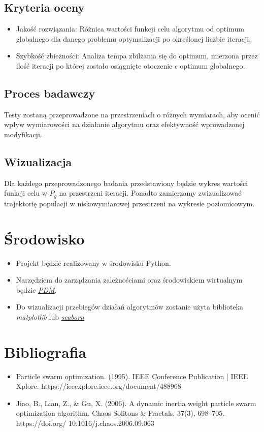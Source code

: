 \documentclass[12pt]{article}
\begin{document}
\subsection*{Kryteria oceny}
\begin{itemize}
	\item{Jakość rozwiązania: Różnica wartości funkcji celu algorytmu od optimum globalnego dla danego problemu optymalizacji po określonej liczbie iteracji.}

	\item{Szybkość zbieżności: Analiza tempa zbilżania się do optimum, mierzona przez ilość iteracji po której zostało osiągnięte otoczenie $\epsilon$ optimum globalnego.}
\end{itemize}

\subsection*{Proces badawczy}
Testy zostaną przeprowadzone na przestrzeniach o różnych wymiarach, aby ocenić wpływ wymiarowości na działanie algorytmu oraz
efektywność wprowadzonej modyfikacji.

\subsection*{Wizualizacja}
Dla każdego przeprowadzonego badania przedstawiony będzie wykres wartości funkcji celu w \(P_g\) na przestrzeni iteracji.
Ponadto zamierzamy zwizualizować trajektorię populacji w niskowymiarowej przestrzeni na wykresie poziomicowym.

\section{Środowisko}
\begin{itemize}
	\item{Projekt będzie realizowany w środowisku Python.}
	\item{Narzędziem do zarządzania zależnościami oraz środowiskiem wirtualnym będzie \href{https://pdm-project.org/latest/PDM}{\textit{PDM}}.}
	\item{Do wizualizacji przebiegów działań algorytmów zostanie użyta biblioteka \textit{matplotlib} lub \href{https://seaborn.pydata.org/}{\textit{seaborn}}}


\end{itemize}
\section{Bibliografia}
\begin{itemize}
	\item{Particle swarm optimization. (1995). IEEE Conference Publication | IEEE Xplore. https://ieeexplore.ieee.org/document/488968}
	\item{Jiao, B., Lian, Z., \& Gu, X. (2006). A dynamic inertia weight particle swarm optimization algorithm. Chaos Solitons \& Fractals, 37(3), 698–705. https://doi.org/ 10.1016/j.chaos.2006.09.063}
\end{itemize}
\end{document}
